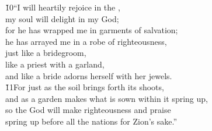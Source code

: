 \begin{poetry}
\poeml \v{10}``I will heartily rejoice in the , \\
\poemll    my soul will delight in my God; \\
\poeml for he has wrapped me in garments of salvation; \\
\poemll    he has arrayed me in a robe of righteousness, \\
\poeml just like a bridegroom, \\
\poemll    like a priest with a garland, \\
\poemlll       and like a bride adorns herself with her jewels. \\
\poeml \v{11}For just as the soil brings forth its shoots, \\
\poemll    and as a garden makes what is sown within it spring up, \\
\poeml so the  God will make righteousness and praise \\
\poemll    spring up before all the nations for Zion's sake.''
\end{poetry}

